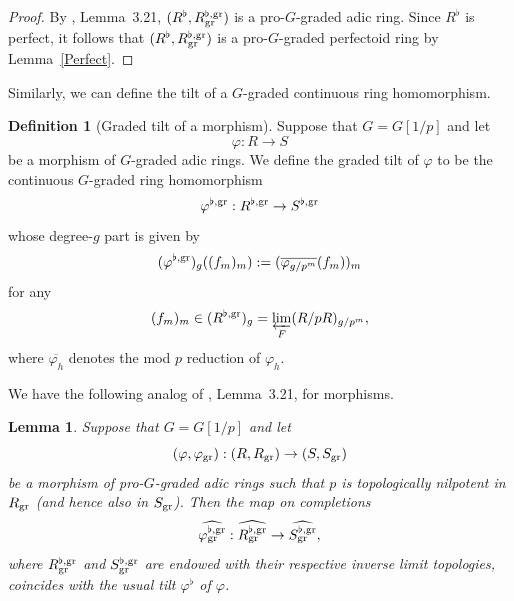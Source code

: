 \documentclass[12pt,twoside,a4paper]{article}
\newtheorem{lemma}[thm]{Lemma}
\theoremstyle{definition}
\newtheorem{mydef}[thm]{Definition}
\theoremstyle{remark}
\newcommand\gr{{\rm gr}}
\begin{document}
\begin{proof}By \cite{Ishizuka-Yoshikawa25}, Lemma~3.21, $(R^{\flat}, R_{\gr}^{\flat,\gr})$ is a pro-$G$-graded adic ring. Since $R^{\flat}$ is perfect, it follows that $(R^{\flat}, R_{\gr}^{\flat,\gr})$ is a pro-$G$-graded perfectoid ring by Lemma~\ref{Perfect}.  \end{proof}
Similarly, we can define the tilt of a $G$-graded continuous ring homomorphism.
\begin{mydef}[Graded tilt of a morphism]\label{Tilt of a morphism}Suppose that $G=G[1/p]$ and let \begin{equation*}\varphi: R\to S\end{equation*}be a morphism of $G$-graded adic rings. We define the graded tilt of $\varphi$ to be the continuous $G$-graded ring homomorphism \begin{equation*}\varphi^{\flat,\gr}: R^{\flat,\gr}\to S^{\flat,\gr}\end{equation*}whose degree-$g$ part is given by \begin{equation*}(\varphi^{\flat,\gr})_{g}((f_{m})_{m}):=(\overline{\varphi_{g/p^{m}}}(f_{m}))_{m}\end{equation*}for any \begin{equation*}(f_{m})_{m}\in (R^{\flat,\gr})_{g}=\varprojlim_{F}(R/pR)_{g/p^{m}},\end{equation*}where $\overline{\varphi_{h}}$ denotes the mod $p$ reduction of $\varphi_{h}$. \end{mydef}
We have the following analog of \cite{Ishizuka-Yoshikawa25}, Lemma~3.21, for morphisms.
\begin{lemma}\label{Graded morphisms and tilting}Suppose that $G=G[1/p]$ and let \begin{equation*}(\varphi, \varphi_{\gr}): (R, R_{\gr})\to (S, S_{\gr})\end{equation*}be a morphism of pro-$G$-graded adic rings such that $p$ is topologically nilpotent in $R_{\gr}$ (and hence also in $S_{\gr}$). Then the map on completions \begin{equation*}\widehat{\varphi_{\gr}^{\flat,\gr}}: \widehat{R_{\gr}^{\flat,\gr}}\to \widehat{S_{\gr}^{\flat,\gr}},\end{equation*}where $R_{\gr}^{\flat,\gr}$ and $S_{\gr}^{\flat,\gr}$ are endowed with their respective inverse limit topologies, coincides with the usual tilt $\varphi^{\flat}$ of $\varphi$. \end{lemma}
\end{document}
